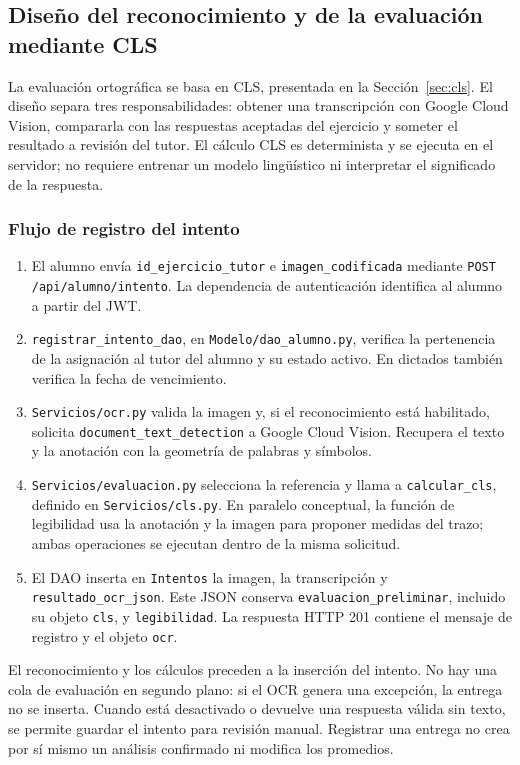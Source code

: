 \subsection{Diseño del reconocimiento y de la evaluación mediante CLS}
\label{sec:vision-metricas}

La evaluación ortográfica se basa en CLS, presentada en la Sección~\ref{sec:cls}. El diseño separa tres responsabilidades: obtener una transcripción con Google Cloud Vision, compararla con las respuestas aceptadas del ejercicio y someter el resultado a revisión del tutor. El cálculo CLS es determinista y se ejecuta en el servidor; no requiere entrenar un modelo lingüístico ni interpretar el significado de la respuesta.

\subsubsection{Flujo de registro del intento}
\begin{enumerate}
    \item El alumno envía \texttt{id\_ejercicio\_tutor} e \texttt{imagen\_codificada} mediante \texttt{POST /api/alumno/intento}. La dependencia de autenticación identifica al alumno a partir del JWT.
    \item \texttt{registrar\_intento\_dao}, en \texttt{Modelo/dao\_alumno.py}, verifica la pertenencia de la asignación al tutor del alumno y su estado activo. En dictados también verifica la fecha de vencimiento.
    \item \texttt{Servicios/ocr.py} valida la imagen y, si el reconocimiento está habilitado, solicita \texttt{document\_text\_detection} a Google Cloud Vision. Recupera el texto y la anotación con la geometría de palabras y símbolos.
    \item \texttt{Servicios/evaluacion.py} selecciona la referencia y llama a \texttt{calcular\_cls}, definido en \texttt{Servicios/cls.py}. En paralelo conceptual, la función de legibilidad usa la anotación y la imagen para proponer medidas del trazo; ambas operaciones se ejecutan dentro de la misma solicitud.
    \item El DAO inserta en \texttt{Intentos} la imagen, la transcripción y \texttt{resultado\_ocr\_json}. Este JSON conserva \texttt{evaluacion\_preliminar}, incluido su objeto \texttt{cls}, y \texttt{legibilidad}. La respuesta HTTP 201 contiene el mensaje de registro y el objeto \texttt{ocr}.
\end{enumerate}

El reconocimiento y los cálculos preceden a la inserción del intento. No hay una cola de evaluación en segundo plano: si el OCR genera una excepción, la entrega no se inserta. Cuando está desactivado o devuelve una respuesta válida sin texto, se permite guardar el intento para revisión manual. Registrar una entrega no crea por sí mismo un análisis confirmado ni modifica los promedios.

